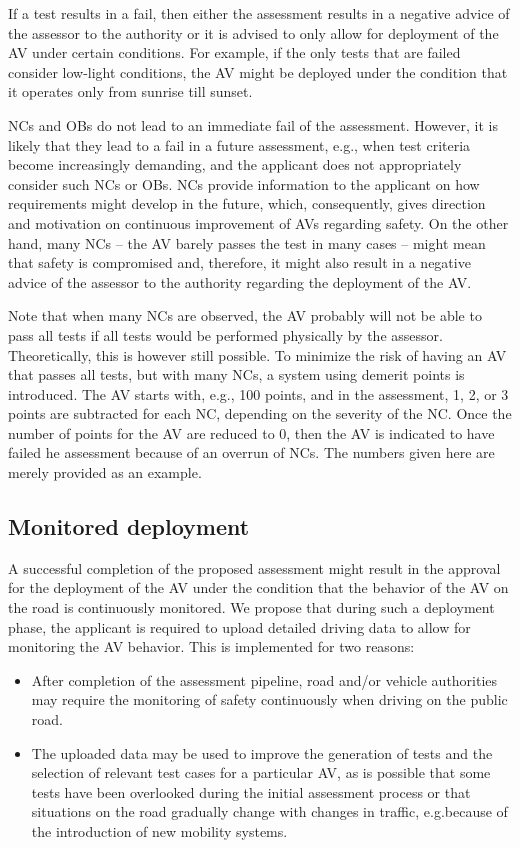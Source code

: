 If a test results in a fail, then either the assessment results in a negative advice of the assessor to the authority or it is advised to only allow for deployment of the AV under certain conditions. For example, if the only tests that are failed consider low-light conditions, the AV might be deployed under the condition that it operates only from sunrise till sunset. 

NCs and OBs do not lead to an immediate fail of the assessment. However, it is likely that they lead to a fail in a future assessment, e.g., when test criteria become increasingly demanding, and the applicant does not appropriately consider such NCs or OBs. NCs provide information to the applicant on how requirements might develop in the future, which, consequently, gives direction and motivation on continuous improvement of AVs regarding safety. On the other hand, many NCs – the AV barely passes the test in many cases – might mean that safety is compromised and, therefore, it might also result in a negative advice of the assessor to the authority regarding the deployment of the AV.

Note that when many NCs are observed, the AV probably will not be able to pass all tests if all tests would be performed physically by the assessor. Theoretically, this is however still possible. To minimize the risk of having an AV that passes all tests, but with many NCs, a system using demerit points is introduced. The AV starts with, e.g., 100 points, and in the assessment, 1, 2, or 3 points are subtracted for each NC, depending on the severity of the NC. Once the number of points for the AV are reduced to 0, then the AV is indicated to have failed he assessment because of an overrun of NCs. The numbers given here are merely provided as an example.



\subsection{Monitored deployment}
\label{sec:monitored deployment}

A successful completion of the proposed assessment might result in the approval for the deployment of the AV under the condition that the behavior of the AV on the road is continuously monitored. We propose that during such a deployment phase, the applicant is required to upload detailed driving data to allow for monitoring the AV behavior. This is implemented for two reasons:
\begin{itemize}
	\item After completion of the assessment pipeline, road and/or vehicle authorities may require the monitoring of safety continuously when driving on the public road.
	\item The uploaded data may be used to improve the generation of tests and the selection of relevant test cases for a particular AV, as is possible that some tests have been overlooked during the initial assessment process or that situations on the road gradually change with changes in traffic, e.g.because of the introduction of new mobility systems.
\end{itemize}


